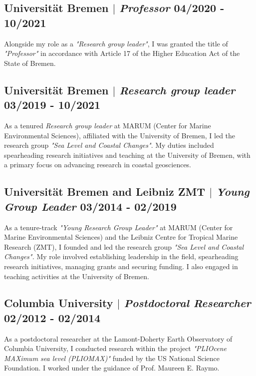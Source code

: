 \documentclass[11pt]{article}
\begin{document}
\subsection{Universität Bremen $|$ {\normalfont\textit{Professor}} \hfill 04/2020 - 10/2021}
{\footnotesize Alongside my role as a \textit{"Research group leader"}, I was granted the title of \textit{"Professor"} in accordance with Article 17 of the Higher Education Act of the State of Bremen.}
\bigskip

\subsection{Universität Bremen $|$ {\normalfont\textit{Research group leader}} \hfill 03/2019 - 10/2021}
{\footnotesize As a tenured \textit{Research group leader} at MARUM (Center for Marine Environmental Sciences), affiliated with the University of Bremen, I led the research group \textit{"Sea Level and Coastal Changes"}. My duties included spearheading research initiatives and teaching at the University of Bremen, with a primary focus on advancing research in coastal geosciences.}
\bigskip

\subsection{Universität Bremen and Leibniz ZMT $|$ {\normalfont\textit{Young Group Leader}} \hfill 03/2014 - 02/2019}
{\footnotesize As a tenure-track \textit{"Young Research Group Leader"} at MARUM (Center for Marine Environmental Sciences) and the Leibniz Centre for Tropical Marine Research (ZMT), I founded and led the research group \textit{"Sea Level and Coastal Changes".} My role involved establishing leadership in the field, spearheading research initiatives, managing grants and securing funding. I also engaged in teaching activities at the University of Bremen.}
\bigskip

\subsection{Columbia University $|$ {\normalfont\textit{Postdoctoral Researcher}} \hfill 02/2012 - 02/2014}
{\footnotesize As a postdoctoral researcher at the Lamont-Doherty Earth Observatory of Columbia University, I conducted research within the project \textit{"PLIOcene MAXimum sea level (PLIOMAX)"} funded by the US National Science Foundation. I worked under the guidance of Prof. Maureen E. Raymo.}
\bigskip
\end{document}
